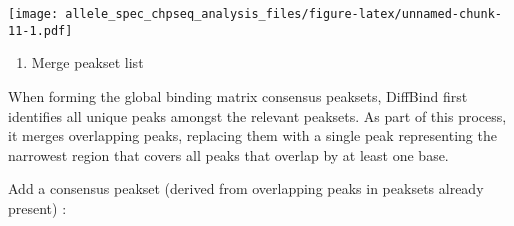 \documentclass[
]{article}
\newenvironment{Shaded}{\begin{snugshade}}{\end{snugshade}}
\newcommand{\DataTypeTok}[1]{\textcolor[rgb]{0.13,0.29,0.53}{#1}}
\newcommand{\DecValTok}[1]{\textcolor[rgb]{0.00,0.00,0.81}{#1}}
\newcommand{\KeywordTok}[1]{\textcolor[rgb]{0.13,0.29,0.53}{\textbf{#1}}}
\newcommand{\NormalTok}[1]{#1}
\newcommand{\OperatorTok}[1]{\textcolor[rgb]{0.81,0.36,0.00}{\textbf{#1}}}
\newcommand{\StringTok}[1]{\textcolor[rgb]{0.31,0.60,0.02}{#1}}
\providecommand{\tightlist}{%
  \setlength{\itemsep}{0pt}\setlength{\parskip}{0pt}}
\begin{document}
\begin{Shaded}
\end{Shaded}

\texttt{[image: allele\_spec\_chpseq\_analysis\_files/figure-latex/unnamed-chunk-11-1.pdf]}

\begin{enumerate}
\def\labelenumi{\arabic{enumi}.}
\setcounter{enumi}{4}
\tightlist
\item
  Merge peakset list
\end{enumerate}

When forming the global binding matrix consensus peaksets, DiffBind
first identifies all unique peaks amongst the relevant peaksets. As part
of this process, it merges overlapping peaks, replacing them with a
single peak representing the narrowest region that covers all peaks that
overlap by at least one base.

Add a consensus peakset (derived from overlapping peaks in peaksets
already present) :

\begin{Shaded}
\end{Shaded}
\end{document}
